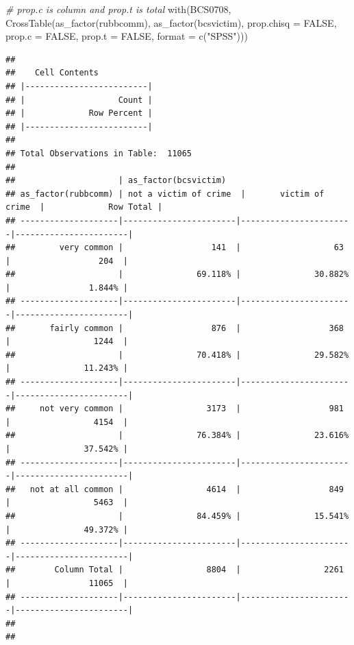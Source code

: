 \documentclass[
]{book}
\newenvironment{Shaded}{\begin{snugshade}}{\end{snugshade}}
\newcommand{\AttributeTok}[1]{\textcolor[rgb]{0.77,0.63,0.00}{#1}}
\newcommand{\CommentTok}[1]{\textcolor[rgb]{0.56,0.35,0.01}{\textit{#1}}}
\newcommand{\ConstantTok}[1]{\textcolor[rgb]{0.00,0.00,0.00}{#1}}
\newcommand{\FunctionTok}[1]{\textcolor[rgb]{0.00,0.00,0.00}{#1}}
\newcommand{\NormalTok}[1]{#1}
\newcommand{\StringTok}[1]{\textcolor[rgb]{0.31,0.60,0.02}{#1}}
\begin{document}
\begin{Shaded}
\begin{Highlighting}[]
\CommentTok{\# prop.c is column and prop.t is total}
\FunctionTok{with}\NormalTok{(BCS0708, }\FunctionTok{CrossTable}\NormalTok{(}\FunctionTok{as\_factor}\NormalTok{(rubbcomm), }
                         \FunctionTok{as\_factor}\NormalTok{(bcsvictim), }
                         \AttributeTok{prop.chisq =} \ConstantTok{FALSE}\NormalTok{, }\AttributeTok{prop.c =} \ConstantTok{FALSE}\NormalTok{, }\AttributeTok{prop.t =} \ConstantTok{FALSE}\NormalTok{, }\AttributeTok{format =}
                           \FunctionTok{c}\NormalTok{(}\StringTok{"SPSS"}\NormalTok{)))}
\end{Highlighting}
\end{Shaded}

\begin{verbatim}
## 
##    Cell Contents
## |-------------------------|
## |                   Count |
## |             Row Percent |
## |-------------------------|
## 
## Total Observations in Table:  11065 
## 
##                     | as_factor(bcsvictim) 
## as_factor(rubbcomm) | not a victim of crime  |       victim of crime  |             Row Total | 
## --------------------|-----------------------|-----------------------|-----------------------|
##         very common |                  141  |                   63  |                  204  | 
##                     |               69.118% |               30.882% |                1.844% | 
## --------------------|-----------------------|-----------------------|-----------------------|
##       fairly common |                  876  |                  368  |                 1244  | 
##                     |               70.418% |               29.582% |               11.243% | 
## --------------------|-----------------------|-----------------------|-----------------------|
##     not very common |                 3173  |                  981  |                 4154  | 
##                     |               76.384% |               23.616% |               37.542% | 
## --------------------|-----------------------|-----------------------|-----------------------|
##   not at all common |                 4614  |                  849  |                 5463  | 
##                     |               84.459% |               15.541% |               49.372% | 
## --------------------|-----------------------|-----------------------|-----------------------|
##        Column Total |                 8804  |                 2261  |                11065  | 
## --------------------|-----------------------|-----------------------|-----------------------|
## 
## 
\end{verbatim}
\end{document}
